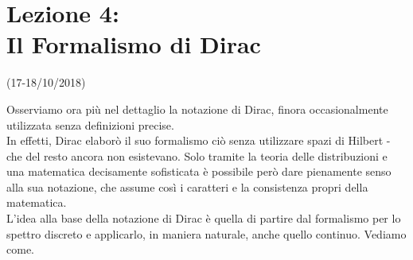 \documentclass[../../FisicaTeorica.tex]{subfiles}
\begin{document}
\section{Lezione 4:\\ \large{Il Formalismo di Dirac}}
\vspace{-1em}
\begin{center}
    \small{(17-18/10/2018)}
\end{center}
Osserviamo ora più nel dettaglio la notazione di Dirac, finora occasionalmente utilizzata senza definizioni precise.\\
In effetti, Dirac elaborò il suo formalismo ciò senza utilizzare spazi di Hilbert - che del resto ancora non esistevano. Solo tramite la teoria delle distribuzioni e una matematica decisamente sofisticata è possibile però dare pienamente senso alla sua notazione, che assume così i caratteri e la consistenza propri della matematica.\\
L'idea alla base della notazione di Dirac è quella di partire dal formalismo per lo spettro discreto e applicarlo, in maniera naturale, anche quello continuo. Vediamo come.\\
\end{document}
